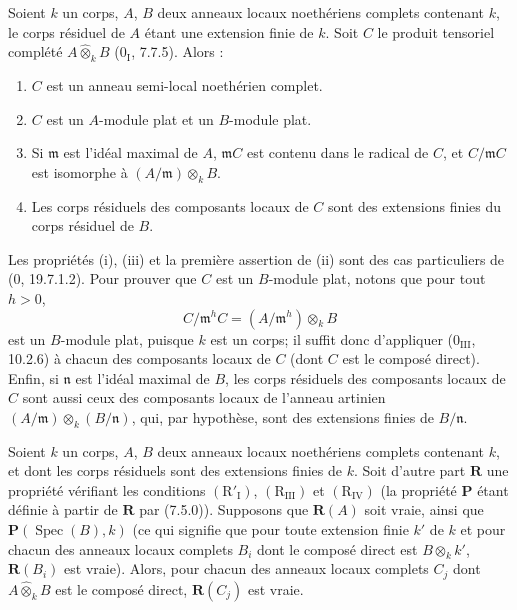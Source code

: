 \begin{lemma}[7.5.5]
\label{IV.2.s7.5.5-fr}
Soient $k$ un corps, $A$, $B$ deux anneaux locaux noethériens complets
contenant $k$, le corps résiduel de $A$ étant une extension finie de $k$. Soit
$C$ le produit tensoriel complété $A\widehat\otimes_k B$
(0$_{\mathrm I}$, 7.7.5). Alors :
\begin{enumerate}
\item[\emph{(i)}] $C$ est un anneau semi-local noethérien complet.
\item[\emph{(ii)}] $C$ est un $A$-module plat et un $B$-module plat.
\item[\emph{(iii)}] Si $\mathfrak m$ est l'idéal maximal de $A$,
$\mathfrak mC$ est contenu dans le radical de $C$, et $C/\mathfrak mC$ est
isomorphe à $(A/\mathfrak m)\otimes_k B$.
\item[\emph{(iv)}] Les corps résiduels des composants locaux de $C$ sont des
extensions finies du corps résiduel de $B$.
\end{enumerate}
Les propriétés (i), (iii) et la première assertion de (ii) sont des cas
particuliers de (0, 19.7.1.2). Pour prouver que $C$ est un $B$-module plat,
notons que pour tout $h>0$,
\[
C/\mathfrak m^hC=(A/\mathfrak m^h)\otimes_k B
\]
est un $B$-module plat, puisque $k$ est un corps; il suffit donc d'appliquer
(0$_{\mathrm{III}}$, 10.2.6) à chacun des composants locaux de $C$ (dont $C$
est le composé direct). Enfin, si $\mathfrak n$ est l'idéal maximal de $B$, les
corps résiduels des composants locaux de $C$ sont aussi ceux des composants
locaux de l'anneau artinien
$(A/\mathfrak m)\otimes_k(B/\mathfrak n)$, qui, par hypothèse, sont des
extensions finies de $B/\mathfrak n$.
\end{lemma}

\begin{proposition}[7.5.6]
\label{IV.2.s7.5.6-fr}
Soient $k$ un corps, $A$, $B$ deux anneaux locaux noethériens complets
contenant $k$, et dont les corps résiduels sont des extensions finies de $k$.
Soit d'autre part $\boldsymbol R$ une propriété vérifiant les conditions
$(\mathrm R'_{\mathrm I})$, $(\mathrm R_{\mathrm{III}})$ et
$(\mathrm R_{\mathrm{IV}})$ (la propriété $\boldsymbol P$ étant définie à
partir de $\boldsymbol R$ par (7.5.0)). Supposons que $\boldsymbol R(A)$ soit
vraie, ainsi que $\boldsymbol P(\operatorname{Spec}(B),k)$ (ce qui signifie que
pour toute extension finie $k'$ de $k$ et pour chacun des anneaux locaux
complets $B_i$ dont le composé direct est $B\otimes_k k'$,
$\boldsymbol R(B_i)$ est vraie). Alors, pour chacun des anneaux locaux complets
$C_j$ dont $A\widehat\otimes_k B$ est le composé direct,
$\boldsymbol R(C_j)$ est vraie.
\end{proposition}

